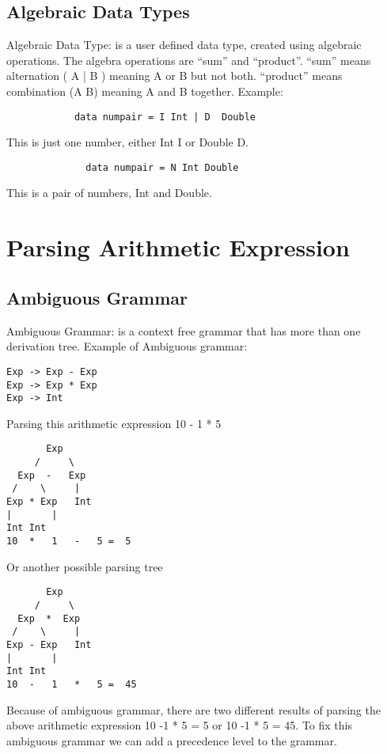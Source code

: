 \documentclass{article}
\begin{document}
\subsection{Algebraic Data Types}
Algebraic Data Type: is a user defined data type, created using algebraic operations. The algebra operations are “sum” and “product”.
“sum” means alternation ( A | B ) meaning A or B but not both.
“product” means combination (A B) meaning A and B together.
\newline Example:
\begin{lstlisting}
            data numpair = I Int | D  Double
\end{lstlisting}
             This is just one number, either Int I or Double D.
\begin{lstlisting}
              data numpair = N Int Double
\end{lstlisting}
              This is a pair of numbers, Int and Double.
              
\section{Parsing Arithmetic Expression}              
\subsection{Ambiguous Grammar}
Ambiguous Grammar: is a context free grammar that has more than one derivation tree.
\newline \newline Example of Ambiguous grammar:
\begin{lstlisting}
Exp -> Exp - Exp 
Exp -> Exp * Exp
Exp -> Int
\end{lstlisting}
\indent Parsing this arithmetic expression  10 - 1 * 5 
\begin{lstlisting}
	   Exp
	 /     \
  Exp  -   Exp
 /    \     | 
Exp * Exp   Int
|       | 
Int	Int
10  *   1   -   5 =  5
\end{lstlisting}
Or another possible parsing tree
\begin{lstlisting}
	   Exp
	 /     \
  Exp  *  Exp
 /    \     | 
Exp - Exp   Int
|       | 
Int	Int
10  -   1   *   5 =  45
\end{lstlisting}
 Because of ambiguous grammar, there are two different results of parsing the above arithmetic expression 10 -1 * 5 = 5 or 10 -1 * 5 = 45.
 \newline To fix this ambiguous grammar we can add a precedence level to the grammar.
\end{document}
